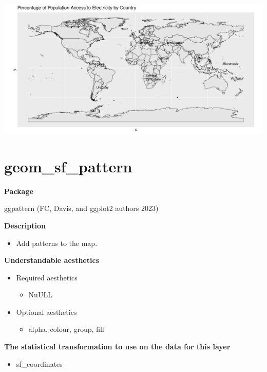\documentclass[
  letterpaper,
  DIV=11,
  numbers=noendperiod]{scrreprt}
\providecommand{\tightlist}{%
  \setlength{\itemsep}{0pt}\setlength{\parskip}{0pt}}\usepackage{longtable,booktabs,array}
\begin{document}
\includegraphics{s_files/figure-pdf/unnamed-chunk-11-1.pdf}

\section{geom\_sf\_pattern}\label{geom_sf_pattern}

\textbf{Package}

ggpattern (FC, Davis, and ggplot2 authors 2023)

\textbf{Description}

\begin{itemize}
\tightlist
\item
  Add patterns to the map.
\end{itemize}

\textbf{Understandable aesthetics}

\begin{itemize}
\tightlist
\item
  Required aesthetics

  \begin{itemize}
  \tightlist
  \item
    NuULL
  \end{itemize}
\item
  Optional aesthetics

  \begin{itemize}
  \tightlist
  \item
    alpha, colour, group, fill
  \end{itemize}
\end{itemize}

\textbf{The statistical transformation to use on the data for this
layer}

\begin{itemize}
\tightlist
\item
  sf\_coordinates
\end{itemize}
\end{document}
